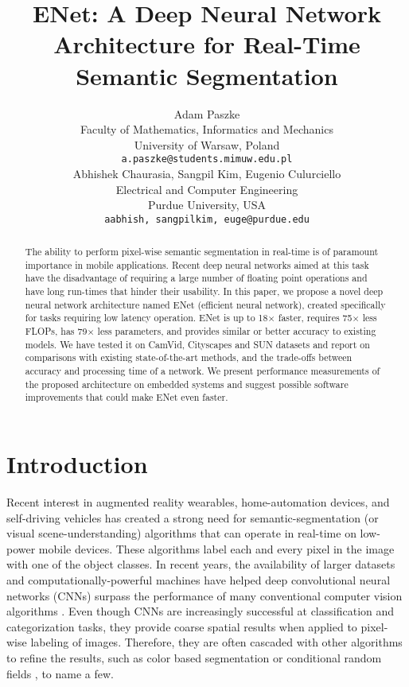 \documentclass{article}
\title{ENet: A Deep Neural Network Architecture for Real-Time Semantic Segmentation}
\author{
  Adam Paszke\\
  Faculty of Mathematics, Informatics and Mechanics\\
  University of Warsaw, Poland \\
  \texttt{a.paszke@students.mimuw.edu.pl} \\
  \And
  Abhishek Chaurasia, Sangpil Kim, Eugenio Culurciello\\
  Electrical and Computer Engineering\\
  Purdue University, USA\\
  \texttt{aabhish, sangpilkim, euge@purdue.edu}\\
}
\begin{document}
\maketitle

\begin{abstract}
The ability to perform pixel-wise semantic segmentation in real-time is of paramount importance in mobile applications.
Recent deep neural networks aimed at this task have the disadvantage of requiring a large number of floating point operations and have long run-times that hinder their usability.
In this paper, we propose a novel deep neural network architecture named ENet (efficient neural network), created specifically for tasks requiring low latency operation.
ENet is up to 18$\times$ faster, requires 75$\times$ less FLOPs, has 79$\times$ less parameters, and provides similar or better accuracy to existing models.
We have tested it on CamVid, Cityscapes and SUN datasets and report on comparisons with existing state-of-the-art methods, and the trade-offs between accuracy and processing time of a network.
We present performance measurements of the proposed architecture on embedded systems and suggest possible software improvements that could make ENet even faster.
\end{abstract}

\section{Introduction}

Recent interest in augmented reality wearables, home-automation devices, and self-driving vehicles has created a strong need for semantic-segmentation (or visual scene-understanding) algorithms that can operate in real-time on low-power mobile devices.
These algorithms label each and every pixel in the image with one of the object classes.
In recent years, the availability of larger datasets and computationally-powerful machines have helped deep convolutional neural networks (CNNs) \cite{lecun1998cnn,alex2012,karen14,christian15} surpass the performance of many conventional computer vision algorithms \cite{jamie09,perr2010,vande2011}.
Even though CNNs are increasingly successful at classification and categorization tasks, they provide coarse spatial results when applied to pixel-wise labeling of images.
Therefore, they are often cascaded with other algorithms to refine the results, such as color based segmentation \cite{clement13} or conditional random fields \cite{liang14}, to name a few.
\end{document}
